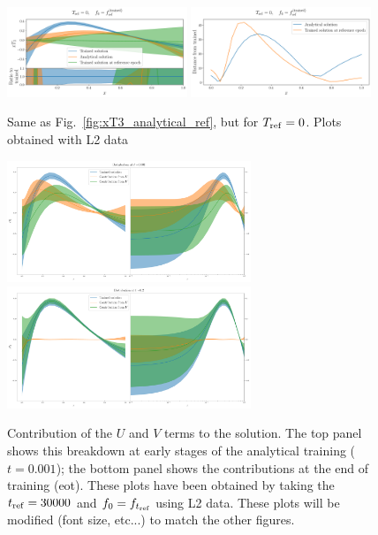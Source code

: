   \begin{figure}[h]
    \centering
    \includegraphics[width=0.48\textwidth]{plots/pdf_plot_ref_0.pdf}
    \includegraphics[width=0.48\textwidth]{plots/distance_plot_ref_0.pdf}
    \caption{Same as Fig.~\ref{fig:xT3_analytical_ref}, but for $T_{\rm ref} = 0$.
    \ac{Plots obtained with L2 data}}
    \label{fig:xT3_analytical_ref_0}
  \end{figure}

\begin{figure}[t!]
    \centering
    \includegraphics[width=0.65\textwidth]{plots/xT3_u_v_contribution_small_t.pdf}
    \\
    \includegraphics[width=0.65\textwidth]{plots/xT3_u_v_contribution_eot.pdf}
    \caption{Contribution of the $U$ and $V$ terms to the solution. The top panel
    shows this breakdown at early stages of the analytical training ($t=0.001$);
    the bottom panel shows the contributions at the end of training (eot). 
    These plots have been obtained by taking the
    $t_{\rm ref} = 30000$ and $f_0 = f_{t_{\rm ref}}$ using L2 data. \ac{These
    plots will be modified (font size, etc...) to match the other figures.}}
  \end{figure}
  
  
\FloatBarrier
